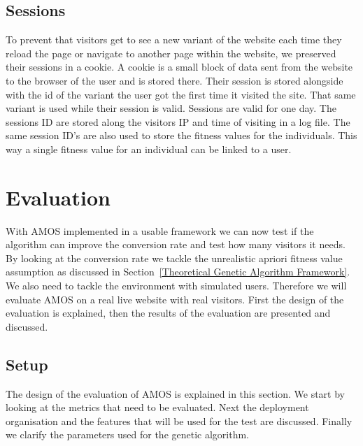 \documentclass{report}
\begin{document}
\section{Sessions}
To prevent that visitors get to see a new variant of the website each time they reload the page or navigate to another page within the website, we preserved their sessions in a cookie. A cookie is a small block of data sent from the website to the browser of the user and is stored there. Their session is stored alongside with the id of the variant the user got the first time it visited the site. That same variant is used while their session is valid. Sessions are valid for one day. The sessions ID are stored along the visitors IP and time of visiting in a log file. The same session ID's are also used to store the fitness values for the individuals. This way a single fitness value for an individual can be linked to a user.
\FloatBarrier

\chapter{Evaluation}
With AMOS implemented in a usable framework we can now test if the algorithm can improve the conversion rate and test how many visitors it needs. By looking at the conversion rate we tackle the unrealistic apriori fitness value assumption as discussed in Section~\ref{Theoretical Genetic Algorithm Framework}. We also need to tackle the environment with simulated users. Therefore we will evaluate AMOS on a real live website with real visitors. First the design of the evaluation is explained, then the results of the evaluation are presented and discussed.
\section{Setup}
The design of the evaluation of AMOS is explained in this section. We start by looking at the metrics that need to be evaluated. Next the deployment organisation and the features that will be used for the test are discussed. Finally we clarify the parameters used for the genetic algorithm.
\end{document}
